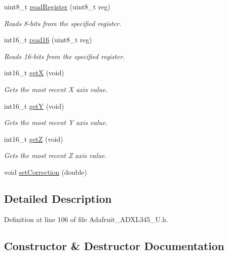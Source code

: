 \begin{DoxyCompactItemize}
uint8\+\_\+t \hyperlink{class_adafruit___a_d_x_l345___unified_ab56b668f36793605d7be009a7efb74e8}{read\+Register} (uint8\+\_\+t reg)
\begin{DoxyCompactList}\small\item\em Reads 8-\/bits from the specified register. \end{DoxyCompactList}\item 
int16\+\_\+t \hyperlink{class_adafruit___a_d_x_l345___unified_a62c1c34b81fdcb7825d7c9911fba988b}{read16} (uint8\+\_\+t reg)
\begin{DoxyCompactList}\small\item\em Reads 16-\/bits from the specified register. \end{DoxyCompactList}\item 
int16\+\_\+t \hyperlink{class_adafruit___a_d_x_l345___unified_a5ad11ba3d12aa4f4aaaec38b3400fa6f}{getX} (void)
\begin{DoxyCompactList}\small\item\em Gets the most recent X axis value. \end{DoxyCompactList}\item 
int16\+\_\+t \hyperlink{class_adafruit___a_d_x_l345___unified_ac745aefc2a66094a9c46115564939610}{getY} (void)
\begin{DoxyCompactList}\small\item\em Gets the most recent Y axis value. \end{DoxyCompactList}\item 
int16\+\_\+t \hyperlink{class_adafruit___a_d_x_l345___unified_ae61417ef16d19ff86ecd82efc14e960b}{getZ} (void)
\begin{DoxyCompactList}\small\item\em Gets the most recent Z axis value. \end{DoxyCompactList}\item 
void \hyperlink{class_adafruit___a_d_x_l345___unified_a812faf0e78b3f34a7dfe2fc701baedd7}{set\+Correction} (double)
\end{DoxyCompactItemize}


\subsection{Detailed Description}


Definition at line 106 of file Adafruit\+\_\+\+A\+D\+X\+L345\+\_\+\+U.\+h.



\subsection{Constructor \& Destructor Documentation}
